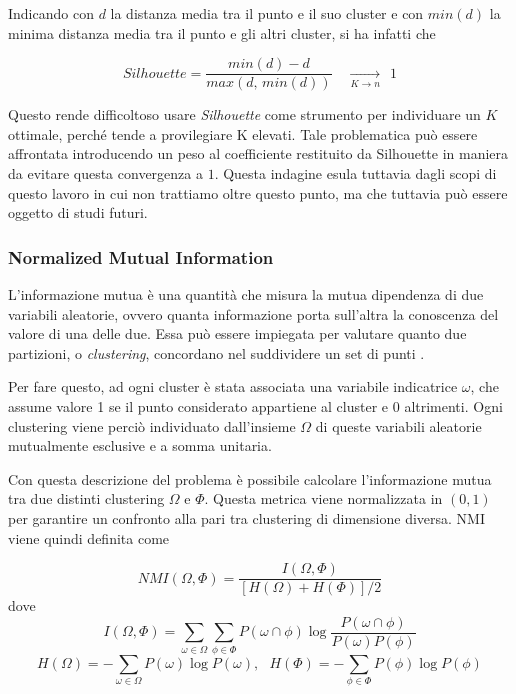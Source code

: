 \documentclass[
	11pt, %
	a4paper, %
	oneside, %
	headinclude,footinclude, %
	BCOR5mm, %
]{scrartcl}
\begin{document}
			Indicando con $d$ la distanza media tra il punto e il suo cluster e con $min(d)$ la minima distanza media tra il punto e gli altri cluster, si ha infatti che

			\begin{equation} \label{eq:silhouetteToOne}
				Silhouette = \frac{min(d) - d}{ max(d, \,min(d)) } \quad \xrightarrow [K \to n] \quad ~~ 1 \end{equation}

			Questo rende difficoltoso usare \emph{Silhouette} come strumento per individuare un $K$ ottimale, perché tende a provilegiare K elevati.
			Tale problematica può essere affrontata introducendo un peso al coefficiente restituito da Silhouette in maniera da evitare questa convergenza a $1$.
			Questa indagine esula tuttavia dagli scopi di questo lavoro in cui non trattiamo oltre questo punto, ma che tuttavia può essere oggetto di studi futuri.

		\subsubsection{Normalized Mutual Information} \label{sec:NMI}
			L'informazione mutua è una quantità che misura la mutua dipendenza di due variabili aleatorie, ovvero quanta informazione porta sull'altra la conoscenza del valore di una delle due.
			Essa può essere impiegata per valutare quanto due partizioni, o \emph{clustering}, concordano nel suddividere un set di punti \cite{Manning}.

			Per fare questo, ad ogni cluster è stata associata una variabile indicatrice $\omega$, che assume valore 1 se il punto considerato appartiene al cluster e 0 altrimenti.
			Ogni clustering viene perciò individuato dall'insieme $\Omega$ di queste variabili aleatorie mutualmente esclusive e a somma unitaria.

			Con questa descrizione del problema è possibile calcolare l'informazione mutua tra due distinti clustering $\Omega$ e $\Phi$.
			Questa metrica viene normalizzata in $(0, 1)$ per garantire un confronto alla pari tra clustering di dimensione diversa.
			NMI viene quindi definita come

			\begin{equation} \label{eq:NMI}
				NMI(\Omega, \Phi) = \frac
					{I(\Omega, \Phi)}
					{\left[ H(\Omega) + H(\Phi)\right] / 2}
			\end{equation}
			dove
			$$ I(\Omega, \Phi) =
					\sum_{\omega \in \Omega} \sum_{\phi \in \Phi}
						P(\omega \cap \phi) \log \frac {P(\omega \cap \phi)} {P(\omega) P(\phi)} $$
			$$ H(\Omega) = - \sum_{\omega \in \Omega} P(\omega) \log P(\omega), ~~~ H(\Phi) = - \sum_{\phi \in \Phi} P(\phi) \log P(\phi) $$
\end{document}
